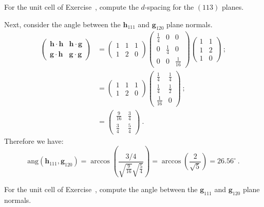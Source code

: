 \begin{exercise}
For the unit cell of Exercise~, compute the $d$-spacing for the $(113)$ planes.
\end{exercise}

\begin{example}
Next, consider the angle between the $\mathbf{h}_{111}$ and $\mathbf{g}_{120}$ plane normals.  
\begin{align*}
	\left(\begin{array}{cc}\mathbf{h}\cdot\mathbf{h}&\mathbf{h}\cdot\mathbf{g}\\
	\mathbf{g}\cdot\mathbf{h}&\mathbf{g}\cdot\mathbf{g}\end{array}\right) &= \left(\begin{array}{ccc}1 & 1 & 1\\ 1 & 2 & 0\end{array}\right)
	\left(\begin{array}{ccc}
			\frac{1}{4} & 0 & 0\\
			0 & \frac{1}{4} & 0\\
			0 & 0 & \frac{1}{16}\end{array}\right)\left(\begin{array}{cc} 1 & 1\\ 1 & 2\\ 1 & 0\end{array}\right)\ ;\\
	&= \left(\begin{array}{ccc}1 & 1 & 1\\ 1 & 2 & 0\end{array}\right)
	\left(\begin{array}{cc} \frac{1}{4} & \frac{1}{4}\\ \frac{1}{4} & \frac{1}{2}\\ \frac{1}{16} & 0\end{array}\right)\ ; \\
	&= \left(\begin{array}{cc}\frac{9}{16} & \frac{3}{4} \\ \frac{3}{4} & \frac{5}{4} \end{array}\right)\ .
\end{align*}
Therefore we have:
\[
	\text{ang}(\mathbf{h}_{111},\mathbf{g}_{120}) = \arccos\left(\frac{3/4}{\sqrt{\frac{9}{16}}\sqrt{\frac{5}{4}}}\right) = \arccos\left(\frac{2}{\sqrt{5}}\right) = 26.56^{\circ}\ .
\]
\end{example}

\begin{exercise}
For the unit cell of Exercise~, compute the angle between the $\mathbf{g}_{111}$ and $\mathbf{g}_{120}$ plane normals.
\end{exercise}



